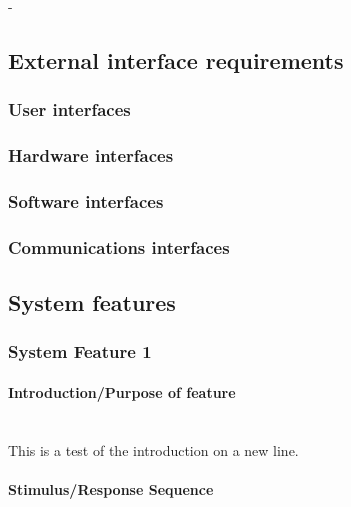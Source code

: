 -\documentclass[compsoc,draftclsnofoot,onecolumn,10pt]{IEEEtran}
\begin{document}
\subsection{External interface requirements}
	\subsubsection{User interfaces}
	\subsubsection{Hardware interfaces}
	\subsubsection{Software interfaces}
	\subsubsection{Communications interfaces}

\subsection{System features}

\subsubsection{System Feature 1}

\paragraph{Introduction/Purpose of feature}~\\
This is a test of the introduction on a new line.

\paragraph{Stimulus/Response Sequence} 
\end{document}
